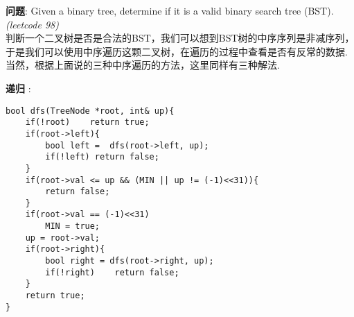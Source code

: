 \documentclass{article}
\begin{document}
\begin{CJK}{UTF8}{gbsn}     %

\else
    
\begin{description}
    \item{\textbf{问题}}: Given a binary tree, determine if it is a valid binary search tree (BST). \textit{(leetcode 98)}
    \\判断一个二叉树是否是合法的BST，我们可以想到BST树的中序序列是非减序列，于是我们可以使用中序遍历这颗二叉树，在遍历的过程中查看是否有反常的数据.
    \\当然，根据上面说的三种中序遍历的方法，这里同样有三种解法.
    \item{\textbf{递归}} : 
    \begin{lstlisting}
bool dfs(TreeNode *root, int& up){
    if(!root)    return true;
    if(root->left){
        bool left =  dfs(root->left, up);
        if(!left) return false;
    }
    if(root->val <= up && (MIN || up != (-1)<<31)){ 
        return false;
    }    
    if(root->val == (-1)<<31)
        MIN = true;
    up = root->val;
    if(root->right){
        bool right = dfs(root->right, up);
        if(!right)    return false;
    }
    return true;
}


\end{lstlisting}
\end{description}
\end{CJK}
\end{document}
